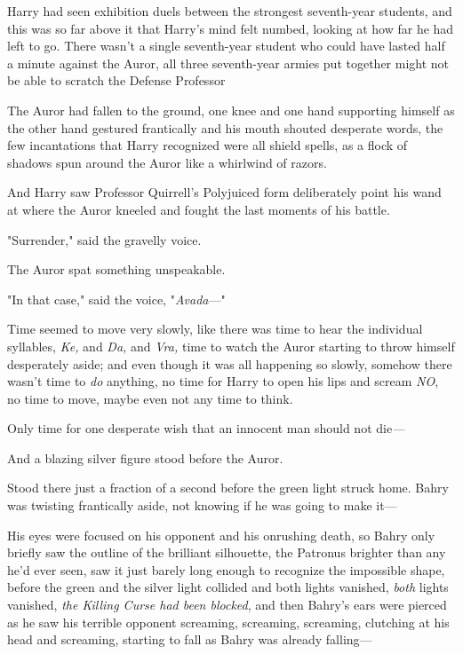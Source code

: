 Harry had seen exhibition duels between the strongest seventh-year students,
and this was so far above it that Harry's mind felt numbed, looking at how far
he had left to go. There wasn't a single seventh-year student who could have
lasted half a minute against the Auror, all three seventh-year armies put
together might not be able to scratch the Defense Professor{\el}

The Auror had fallen to the ground, one knee and one hand supporting himself as
the other hand gestured frantically and his mouth shouted desperate words, the
few incantations that Harry recognized were all shield spells, as a flock of
shadows spun around the Auror like a whirlwind of razors.

And Harry saw Professor Quirrell's Polyjuiced form deliberately point his wand
at where the Auror kneeled and fought the last moments of his battle.

"Surrender," said the gravelly voice.

The Auror spat something unspeakable.

"In that case," said the voice, "\emph{Avada}—"

Time seemed to move very slowly, like there was time to hear the individual
syllables, \emph{Ke,} and \emph{Da,} and \emph{Vra,} time to watch the Auror
starting to throw himself desperately aside; and even though it was all
happening so slowly, somehow there wasn't time to \emph{do} anything, no time
for Harry to open his lips and scream \emph{NO}, no time to move, maybe even
not any time to think.

Only time for one desperate wish that an innocent man should not die\emph{—}

And a blazing silver figure stood before the Auror.

Stood there just a fraction of a second before the green light struck home.
\sbreak
Bahry was twisting frantically aside, not knowing if he was going to make it—

His eyes were focused on his opponent and his onrushing death, so Bahry only
briefly saw the outline of the brilliant silhouette, the Patronus brighter than
any he'd ever seen, saw it just barely long enough to recognize the impossible
shape, before the green and the silver light collided and both lights vanished,
\emph{both} lights vanished, \emph{the Killing Curse had been blocked}, and
then Bahry's ears were pierced as he saw his terrible opponent screaming,
screaming, screaming, clutching at his head and screaming, starting to fall as
Bahry was already falling—

